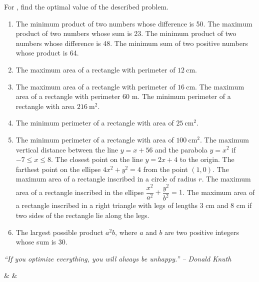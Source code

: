 \documentclass{book}
\begin{document}
For , find the optimal value of the described problem.
\begin{enumerate}[!HW!]
\item\label{exer:optimize:start}  The minimum product of two numbers whose difference is 50. 
\itemspade The maximum product of two numbers whose sum is 23. 
\itemspade The minimum product of two numbers whose difference is 48. 
\itemspade The minimum sum of two positive numbers whose product is 64. 
\item The maximum area of a rectangle with perimeter of $12\ \text{cm}$. 
\item The maximum area of a rectangle with perimeter of $16\ \text{cm}$. 
\itemspade The maximum area of a rectangle with perimeter 60 m.
\itemspade The minimum perimeter of a rectangle with area $216\ \text{m}^2$.
\item The minimum perimeter of a rectangle with area of $25\ \text{cm}^2$. 
\item The minimum perimeter of a rectangle with area of $100\ \text{cm}^2$. 
\itemspade The maximum vertical distance between the line $y=x+56$ and the parabola $y=x^2$ if $-7\le x \le 8$. 
\itemspade The closest point on the line $y=2x+4$ to the origin. 
\itemspade The farthest point on the ellipse $4x^2 + y^2 = 4$ from the point $(1,0)$. 
\itemspade The maximum area of a rectangle inscribed in a circle of radius $r$. 
\itemspade The maximum area of a rectangle inscribed in the ellipse $\dfrac{x^2}{a^2}+\dfrac{y^2}{b^2}=1$. 
\itemspade The maximum area of a rectangle inscribed in a right triangle with legs of lengths 3 cm and 8 cm if two sides of the rectangle lie along the legs. 
\item\label{exer:optimize:stop} The largest possible product $a^2b$, where $a$ and $b$ are two positive integers whose sum is 30. 
\end{enumerate}
\pagebreak

\begin{center} 
\emph{``If you optimize everything, you will always be unhappy.'' -- Donald Knuth}
\end{center}

\begin{Videos}
 &
  &
\end{Videos}
\end{document}
